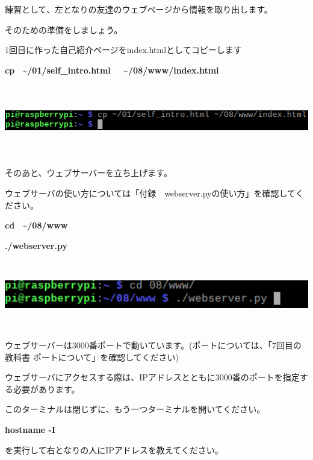 \documentclass[a4paper,12pt,dvipdfmx]{jarticle}
\begin{document}
練習として、左となりの友達のウェブページから情報を取り出します。

そのための準備をしましょう。

1回目に作った自己紹介ページをindex.htmlとしてコピーします

\textbf{cp \ \~{}/01/self\_intro.html \ \ \~{}/08/www/index.html}



\begin{center}
\includegraphics[width=17.006cm,height=3.134cm]{textbook-img002.png}

\end{center}
\clearpage
そのあと、ウェブサーバーを立ち上げます。

ウェブサーバの使い方については「付録　webserver.pyの使い方」を確認してください。

\textbf{cd \ \~{}/08/www}

\textbf{./webserver.py}



\begin{center}
\includegraphics[width=17.006cm,height=2.992cm]{textbook-img003.png}

\end{center}
ウェブサーバーは3000番ポートで動いています。(ポートについては、「7回目の教科書
ポートについて」を確認してください)%


ウェブサーバにアクセスする際は、IPアドレスとともに3000番のポートを指定する必要があります。

このターミナルは閉じずに、もう一つターミナルを開いてください。

\textbf{hostname -I}

を実行して右となりの人にIPアドレスを教えてください。
\end{document}
